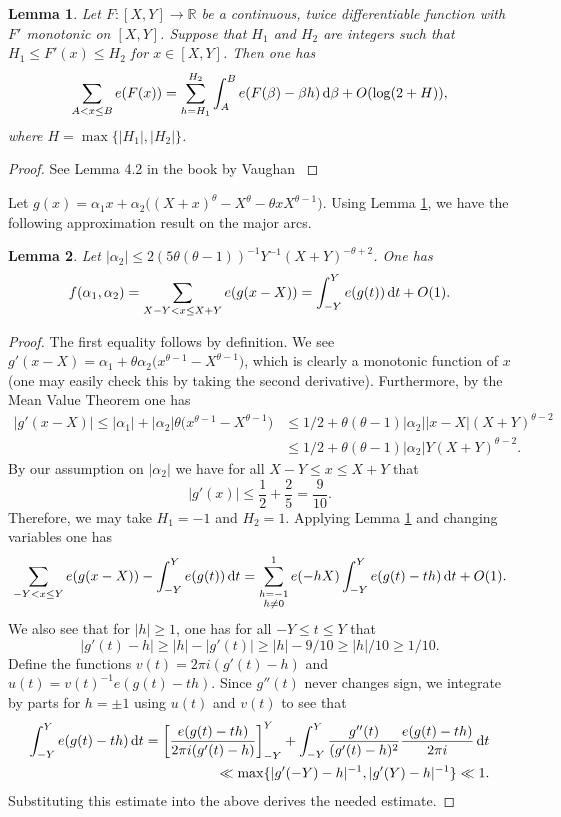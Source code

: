 \documentclass[11pt,reqno]{amsart}
\numberwithin{equation}{section}
\newtheorem{lemma}{Lemma}[section]
\renewcommand{\d}{\,{\rm d}}
\begin{document}
\begin{lemma} \label{lem:poisson}
Let $F: [X, Y] \to \mathbb{R} $ be a continuous, twice differentiable function with $F'$ monotonic on $[X,Y]$. Suppose that $H_1$ and $H_2$ are integers such that $H_1 \leq F'(x) \leq H_2$ for $x \in [X,Y]$. Then one has 
\[ \sum_{A < x \leq B} e(F(x)) = \sum_{h = H_1}^{H_2} \int_A^B e(F(\beta)-\beta h)\d\beta + O(\log(2+H)), \]
where $H = \max\{ |H_1|, |H_2|\}$. 
\end{lemma} 

\begin{proof} See Lemma 4.2 in the book by Vaughan \cite{Vbook}
\end{proof}

Let $g(x) = \alpha_1 x +\alpha_2\big((X+x)^{\theta}-X^{\theta}-\theta xX^{\theta-1} \big) $. Using Lemma \ref{lem:poisson}, we have the following approximation result on the major arcs.

\begin{lemma} \label{lem:approx}
Let $|\alpha_2| \leq 2(5\theta(\theta-1))^{-1} Y^{-1}(X+Y)^{-\theta+2}$. One has 
\[ f(\alpha_1,\alpha_2)= \sum_{X-Y <  x \leq X+Y} e(g(x-X)) = \int_{-Y}^{Y} e(g(t))\d t + O(1). \]
\end{lemma}

\begin{proof} The first equality follows by definition. We see $g'(x-X) = \alpha_1 +\theta\alpha_2\big(x^{\theta-1}- X^{\theta-1}\big) $, which is clearly a monotonic function of $x$ (one may easily check this by taking the second derivative). Furthermore, by the Mean Value Theorem one has 
\begin{align*} |g'(x-X)| \leq |\alpha_1| + |\alpha_2|\theta\big(x^{\theta-1}-X^{\theta-1}\big) & \leq 1/2+\theta(\theta-1)|\alpha_2||x-X|(X+Y)^{\theta-2} \\ &
\leq 1/2 + \theta(\theta-1)|\alpha_2|Y(X+Y)^{\theta-2}. 
\end{align*}
By our assumption on $|\alpha_2|$ we have for all $X-Y \leq x \leq X+Y$ that 
\[ |g'(x)| \leq \frac{1}{2}+\frac{2}{5} = \frac{9}{10}. \]
Therefore, we may take $H_1 = -1$ and $H_2 = 1$. 
Applying Lemma \ref{lem:poisson} and changing variables one has 
\[ \sum_{-Y < x \leq Y} e(g(x-X)) - \int_{-Y}^Y e(g(t))\d t = \sum_{\substack{h = -1 \\ h \neq 0}}^1 e(-hX) \int_{-Y}^{Y} e(g(t)-th)\d t + O(1). \]
We also see that for $|h| \geq 1$, one has for all $-Y \leq t \leq Y$ that 
\[ |g'(t)-h| \geq |h| - |g'(t)| \geq |h|-9/10 \geq |h|/10 \geq 1/10. \]
Define the functions  $v(t) = 2\pi i(g'(t)-h)$ and $u(t) =v(t)^{-1}e(g(t)-th)$. Since $g''(t)$ never changes sign, we integrate by parts for $h = \pm 1$ using $u(t)$ and $v(t)$ to see that 
\begin{align*} \int_{-Y}^Y e(g(t)-th)\d t = \left[ \frac{e(g(t)-th)}{2\pi i (g'(t)-h)} \right]_{-Y}^Y +\int_{-Y}^Y \frac{g''(t)}{(g'(t)-h)^2}\frac{e(g(t)-th)}{2\pi i}\d t \\
\ll \max \{ |g'(-Y)-h|^{-1}, |g'(Y)-h|^{-1} \} \ll 1. 
\end{align*}
Substituting this estimate into the above derives the needed estimate. 
\end{proof}
\end{document}
